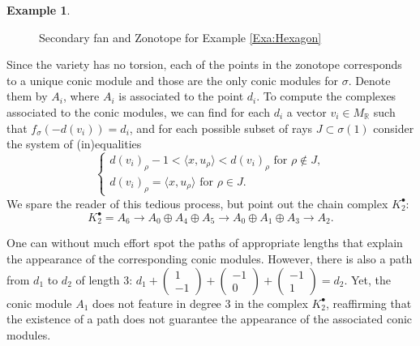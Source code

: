 \documentclass[reqno, 12pt]{amsart}
\theoremstyle{definition}
\newtheorem{example}[theorem]{Example}
\numberwithin{equation}{section}
\newcommand{\R}{\mathbb{R}}
\begin{document}
\begin{example}
\begin{figure}[ht!]
    \centering
{}
 \caption{Secondary fan and Zonotope for Example \ref{Exa:Hexagon}}
  \label{fig:Hexagon}
\end{figure}
 
    Since the variety has no torsion, each of the points in the zonotope corresponds to a unique conic module and those are the only conic modules for $\sigma$. Denote them by $A_i$, where $A_i$ is associated to the point $d_i$. To compute the complexes associated to the conic modules, we can find for each $d_i$ a vector $v_i\in M_\R$ such that $f_\sigma(-d(v_i))=d_i$, and for each possible subset of rays $J\subset \sigma(1)$ consider the system of (in)equalities \[
    \begin{cases}
        d(v_i)_\rho-1 < \langle x,u_\rho\rangle< d(v_i)_\rho\text{ for }\rho\not\in J,\\
        d(v_i)_\rho=\langle x,u_\rho\rangle\text{ for }\rho\in J.
    \end{cases}
    \] 
    We spare the reader of this tedious process, but point out the chain complex $K_2^\bullet$:
    \[
    K_2^\bullet=A_6\rightarrow A_0\oplus A_4\oplus A_5\rightarrow A_0\oplus A_1\oplus A_3\rightarrow A_2.
    \]

    One can without much effort spot the paths of appropriate lengths that explain the appearance of the corresponding conic modules. However, there is also a path from $d_1$ to $d_2$ of length 3: $d_1+\begin{pmatrix} 1\\-1\end{pmatrix}+\begin{pmatrix} -1\\0\end{pmatrix}+\begin{pmatrix} -1\\1\end{pmatrix}=d_2$. Yet, the conic module $A_1$ does not feature in degree 3 in the complex $K_2^\bullet$, reaffirming that the existence of a path does not guarantee the appearance of the associated conic modules.
\end{example}
\end{document}
